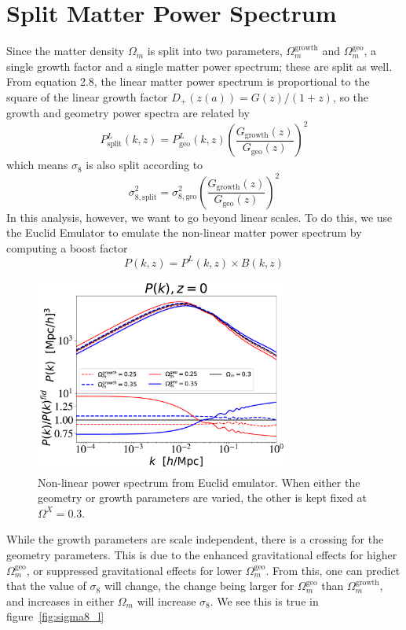 \section{Split Matter Power Spectrum}
Since the matter density $\Omega_m$ is split into two parameters, $\Omega_m^{\text{growth}}$ and $\Omega_m^{\text{geo}}$, a single growth factor and a single matter power spectrum; these are split as well. From equation 2.8, the linear matter power spectrum is proportional to the square of the linear growth factor $D_+(z(a)) = G(z)/(1+z)$, so the growth and geometry power spectra are related by
\begin{equation}
	P^L_{\text{split}}(k,z) = P^L_{\text{geo}}(k,z) \left(\frac{G_{\text{growth}}(z)}{G_{\text{geo}}(z)}\right)^2
\end{equation}
which means $\sigma_8$ is also split according to
\begin{equation}
	\sigma_{8,\text{split}}^2 = \sigma_{8,\text{geo}}^2 \left(\frac{G_{\text{growth}}(z)}{G_{\text{geo}}(z)}\right)^2
\end{equation}
In this analysis, however, we want to go beyond linear scales. To do this, we use the Euclid Emulator to emulate the non-linear matter power spectrum by computing a boost factor
\begin{equation}
	P(k,z) = P^L(k,z) \times B(k,z)
\end{equation}
\begin{figure}[ht]
	\centering
	\includegraphics[width=0.75\textwidth]{plots/Pk.pdf}
	\caption{Non-linear power spectrum from Euclid emulator. When either the geometry or growth parameters are varied, the other is kept fixed at $\Omega^X=0.3$.}
	\label{fig:pk}
\end{figure}
While the growth parameters are scale independent, there is a crossing for the geometry parameters. This is due to the enhanced gravitational effects for higher $\Omega_m^{\mathrm{geo}}$, or suppressed gravitational effects for lower $\Omega_m^\mathrm{geo}$. From this, one can predict that the value of $\sigma_8$ will change, the change being larger for $\Omega_m^\mathrm{geo}$ than $\Omega_m^\mathrm{growth}$, and increases in either $\Omega_m$ will increase $\sigma_8$. We see this is true in figure~\ref{fig:sigma8_l}
